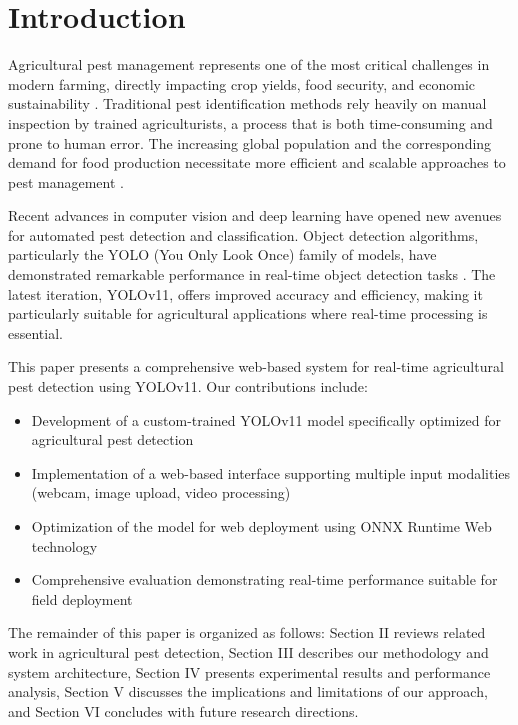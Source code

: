 \documentclass[conference]{IEEEtran}
\begin{document}
\section{Introduction}

Agricultural pest management represents one of the most critical challenges in modern farming, directly impacting crop yields, food security, and economic sustainability \cite{ref1}. Traditional pest identification methods rely heavily on manual inspection by trained agriculturists, a process that is both time-consuming and prone to human error. The increasing global population and the corresponding demand for food production necessitate more efficient and scalable approaches to pest management \cite{ref2}.

Recent advances in computer vision and deep learning have opened new avenues for automated pest detection and classification. Object detection algorithms, particularly the YOLO (You Only Look Once) family of models, have demonstrated remarkable performance in real-time object detection tasks \cite{ref3}. The latest iteration, YOLOv11, offers improved accuracy and efficiency, making it particularly suitable for agricultural applications where real-time processing is essential.

This paper presents a comprehensive web-based system for real-time agricultural pest detection using YOLOv11. Our contributions include:

\begin{itemize}
\item Development of a custom-trained YOLOv11 model specifically optimized for agricultural pest detection
\item Implementation of a web-based interface supporting multiple input modalities (webcam, image upload, video processing)
\item Optimization of the model for web deployment using ONNX Runtime Web technology
\item Comprehensive evaluation demonstrating real-time performance suitable for field deployment
\end{itemize}

The remainder of this paper is organized as follows: Section II reviews related work in agricultural pest detection, Section III describes our methodology and system architecture, Section IV presents experimental results and performance analysis, Section V discusses the implications and limitations of our approach, and Section VI concludes with future research directions.
\end{document}
